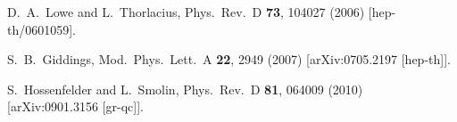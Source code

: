 \documentclass[12pt]{article}
\begin{document}
\begin{thebibliography}{99}
  D.~A.~Lowe and L.~Thorlacius,
  Phys.\ Rev.\ D {\bf 73}, 104027 (2006)
  [hep-th/0601059].

  S.~B.~Giddings,
  Mod.\ Phys.\ Lett.\ A {\bf 22}, 2949 (2007)
  [arXiv:0705.2197 [hep-th]].

  S.~Hossenfelder and L.~Smolin,
  Phys.\ Rev.\ D {\bf 81}, 064009 (2010)
  [arXiv:0901.3156 [gr-qc]].
\end{thebibliography}
\end{document}
